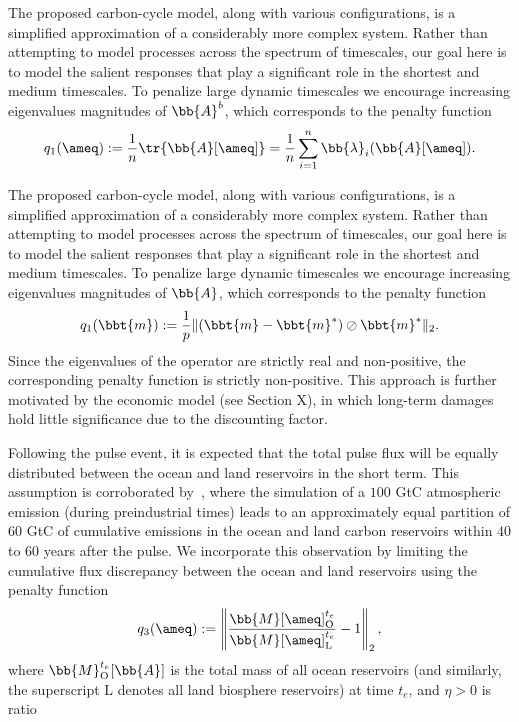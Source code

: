 The proposed carbon-cycle model, along with various configurations, is a simplified approximation of a considerably more complex system. 
%
Rather than attempting to model processes across the spectrum of timescales, our goal here is to model the salient responses that play a significant role in the shortest and medium timescales. 
%
To penalize large dynamic timescales we encourage increasing eigenvalues magnitudes of $\bb{A}^b$, which corresponds to the penalty function
%
\begin{align}\label{eq:clim_model.7}
	q_1(\ameq) := \frac{1}{n} \tr{\bb{A}[\ameq]} = \frac{1}{n}\sum_{i=1}^n \bb{\lambda}_i(\bb{A}[\ameq]).
\end{align}
%



The proposed carbon-cycle model, along with various configurations, is a simplified approximation of a considerably more complex system. 
Rather than attempting to model processes across the spectrum of timescales, our goal here is to model the salient responses that play a significant role in the shortest and medium timescales. 
To penalize large dynamic timescales we encourage increasing eigenvalues magnitudes of $\bb{A}$, which corresponds to the penalty function
%
\begin{align}\label{eq:clim_model.7}
	q_1(\bbt{m}) := \frac{1}{p}\|   (\bbt{m} - \bbt{m}^*) \oslash \bbt{m}^*  \|_2.
\end{align}
%
Since the eigenvalues of the operator are strictly real and non-positive, the corresponding penalty function is strictly non-positive. 
This approach is further motivated by the economic model (see Section X), in which long-term damages hold little significance due to the discounting factor.





Following the pulse event, it is expected that the total pulse flux will be equally distributed between the ocean and land reservoirs in the short term. 
This assumption is corroborated by~\cite{joos2013carbon}, where the simulation of a $100$ GtC atmospheric emission (during preindustrial times) leads to an approximately equal partition of $60$ GtC of cumulative emissions in the ocean and land carbon reservoirs within $40$ to $60$ years after the pulse. 
We incorporate this observation by limiting the cumulative flux discrepancy between the ocean and land reservoirs using the penalty function
\begin{align}\label{eq:clim_model.8}
	q_3(\ameq) := \left \| \frac{  
	\bb{M}[ \ameq ]_{\text{O}}^{t_e}
	}{
	\bb{M}[ \ameq]_{\text{L}}^{t_e}} - 1 \right \|_2,
\end{align}
%
where $\bb{M}^{t_e}_{\text{O}}[\bb{A}]$ is the total mass of all ocean reservoirs (and similarly, the superscript $\text{L}$ denotes all land biosphere reservoirs) at time $t_e$, and $\eta>0$ is ratio  


